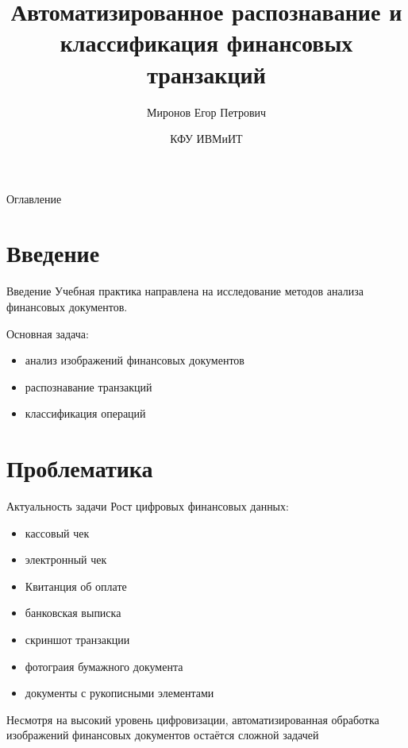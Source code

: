 \documentclass[aspectratio=169]{beamer}
\title{Автоматизированное распознавание и классификация финансовых транзакций}
\author{Миронов Егор Петрович}
\date{КФУ ИВМиИТ}
\begin{document}
\begin{frame}
\titlepage
\end{frame}
\transfade 
\begin{frame}{Оглавление}
\tableofcontents
\end{frame}

\section{Введение}

\begin{frame}{Введение}
Учебная практика направлена на исследование методов анализа финансовых документов.

\pause

Основная задача:
\begin{itemize}
    \item анализ изображений финансовых документов
    \pause
    \item распознавание транзакций
    \pause
    \item классификация операций
\end{itemize}

\end{frame}

\section{Проблематика}

\begin{frame}{Актуальность задачи}
Рост цифровых финансовых данных:
\begin{itemize}
    \item кассовый чек
    \item электронный чек
    \item Квитанция об оплате
    \item банковская выписка
    \item скриншот транзакции
    \item фотограия бумажного документа
    \item документы с рукописными элементами
\end{itemize}

\pause

Несмотря на высокий уровень цифровизации, автоматизированная обработка изображений финансовых документов остаётся сложной задачей

\end{frame}
\end{document}
